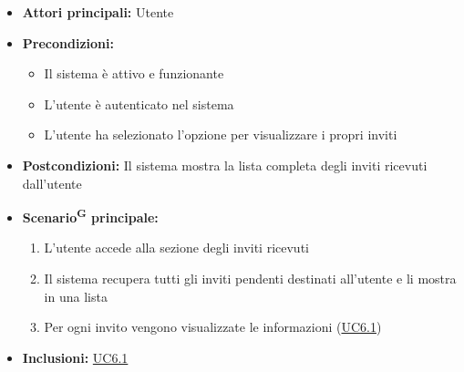 \documentclass[a4paper, 11pt]{article}
\begin{document}
\begin{itemize}
	\item \textbf{Attori principali:} Utente
	\item \textbf{Precondizioni:} 
	\begin{itemize}
		\item Il sistema è attivo e funzionante
		\item L'utente è autenticato nel sistema
        \item L'utente ha selezionato l'opzione per visualizzare i propri inviti
	\end{itemize}	\item \textbf{Postcondizioni:} Il sistema mostra la lista completa degli inviti ricevuti dall'utente

	\item \textbf{Scenario\textsuperscript{G} principale:}
	\begin{enumerate}
		\item L'utente accede alla sezione degli inviti ricevuti
		\item Il sistema recupera tutti gli inviti pendenti destinati all'utente e li mostra in una lista
		\item Per ogni invito vengono visualizzate le informazioni (\hyperref[UC6.1]{UC6.1})
	\end{enumerate}
    \item \textbf{Inclusioni:} \hyperref[UC6.1]{UC6.1}
\end{itemize}
\end{document}
